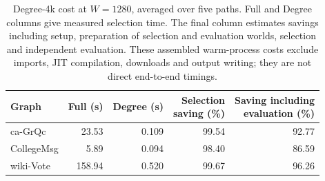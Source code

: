 \begin{table}[htbp]
\caption{Degree-4k cost at $W=1280$, averaged over five paths. Full and Degree columns give measured selection time. The final column estimates savings including setup, preparation of selection and evaluation worlds, selection and independent evaluation. These assembled warm-process costs exclude imports, JIT compilation, downloads and output writing; they are not direct end-to-end timings.}\label{tab:cost}
\begin{tabular}{lrrrr}
\toprule
Graph & Full (s) & Degree (s) & \shortstack{Selection\\saving (\%)} & \shortstack{Saving including\\evaluation (\%)} \\
\midrule
ca-GrQc & 23.53 & 0.109 & 99.54 & 92.77 \\
CollegeMsg & 5.89 & 0.094 & 98.40 & 86.59 \\
wiki-Vote & 158.94 & 0.520 & 99.67 & 96.26 \\
\bottomrule
\end{tabular}
\end{table}
